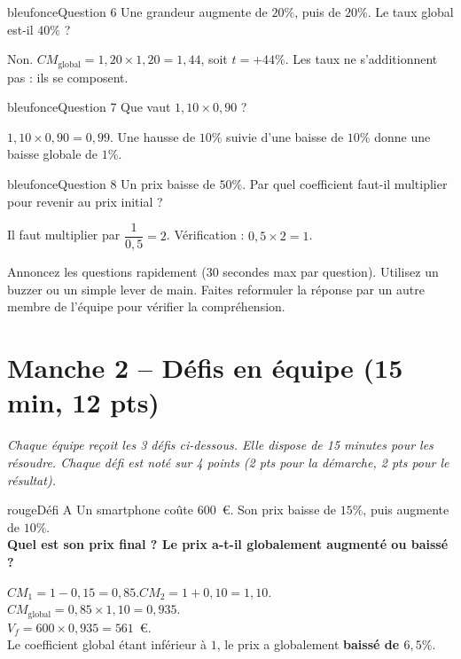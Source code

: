 \documentclass[12pt,a4paper]{article}
\begin{document}
\begin{carte}{bleufonce}{Question 6}
Une grandeur augmente de \(20\%\), puis de \(20\%\). Le taux global est-il \(40\%\) ?
\end{carte}
\begin{corrige}
Non. \(CM_{\text{global}} = 1{,}20 \times 1{,}20 = 1{,}44\), soit \(t = +44\%\). Les taux ne s'additionnent pas : ils se composent.
\end{corrige}

\begin{carte}{bleufonce}{Question 7}
Que vaut \(1{,}10 \times 0{,}90\) ?
\end{carte}
\begin{corrige}
\(1{,}10 \times 0{,}90 = 0{,}99\). Une hausse de \(10\%\) suivie d'une baisse de \(10\%\) donne une baisse globale de \(1\%\).
\end{corrige}

\begin{carte}{bleufonce}{Question 8}
Un prix baisse de \(50\%\). Par quel coefficient faut-il multiplier pour revenir au prix initial ?
\end{carte}
\begin{corrige}
Il faut multiplier par \(\dfrac{1}{0{,}5} = 2\). Vérification : \(0{,}5 \times 2 = 1\).
\end{corrige}

\begin{conseil}
Annoncez les questions rapidement (30 secondes max par question). Utilisez un buzzer ou un simple lever de main. Faites reformuler la réponse par un autre membre de l'équipe pour vérifier la compréhension.
\end{conseil}

\newpage

\section*{Manche 2 -- Défis en équipe (15 min, 12 pts)}

\textit{Chaque équipe reçoit les 3 défis ci-dessous. Elle dispose de 15 minutes pour les résoudre. Chaque défi est noté sur 4 points (2 pts pour la démarche, 2 pts pour le résultat).}

\vspace{0.3cm}

\begin{carte}{rouge}{Défi A}
Un smartphone coûte \(600\)~\euro{}. Son prix baisse de \(15\%\), puis augmente de \(10\%\).\\[0.2cm]
\textbf{Quel est son prix final ? Le prix a-t-il globalement augmenté ou baissé ?}
\end{carte}
\begin{corrige}
\(CM_1 = 1 - 0{,}15 = 0{,}85\).\quad \(CM_2 = 1 + 0{,}10 = 1{,}10\).\\[0.2cm]
\(CM_{\text{global}} = 0{,}85 \times 1{,}10 = 0{,}935\).\\[0.2cm]
\(V_f = 600 \times 0{,}935 = 561\)~\euro{}.\\[0.2cm]
Le coefficient global étant inférieur à \(1\), le prix a globalement \textbf{baissé de \(6{,}5\%\)}.
\end{corrige}
\end{document}
